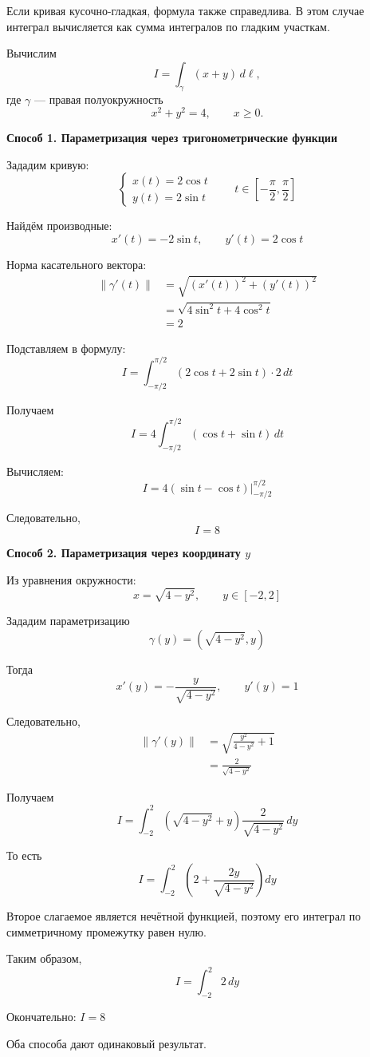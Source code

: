 \documentclass[12pt,a4paper]{article}
\begin{document}
\begin{note}
Если кривая кусочно-гладкая, формула также справедлива. В этом случае интеграл вычисляется как сумма интегралов по гладким участкам.
\end{note}

\begin{example}
Вычислим
\[
I=\int_\gamma(x+y)\,d\ell,
\]
где $\gamma$ — правая полуокружность
\[
x^2+y^2=4,\qquad x\geq0.
\]

\textbf{Способ 1. Параметризация через тригонометрические функции}

Зададим кривую:
\[
\begin{cases}
x(t)=2\cos t\\
y(t)=2\sin t
\end{cases}
\qquad
t\in\left[-\frac{\pi}{2},\frac{\pi}{2}\right]
\]

Найдём производные:
\[
x'(t)=-2\sin t,\qquad
y'(t)=2\cos t
\]

Норма касательного вектора:
\[
\begin{aligned}
\|\gamma'(t)\|
&=\sqrt{(x'(t))^2+(y'(t))^2}\\
&=\sqrt{4\sin^2t+4\cos^2t}\\
&=2
\end{aligned}
\]

Подставляем в формулу:
\[
I=
\int_{-\pi/2}^{\pi/2}
(2\cos t+2\sin t)\cdot2\,dt
\]

Получаем
\[
I=
4\int_{-\pi/2}^{\pi/2}
(\cos t+\sin t)\,dt
\]

Вычисляем:
\[
I=
4\left.
(\sin t-\cos t)
\right|_{-\pi/2}^{\pi/2}
\]

Следовательно,
\[
I=8
\]

\textbf{Способ 2. Параметризация через координату $y$}

Из уравнения окружности:
\[
x=\sqrt{4-y^2},
\qquad
y\in[-2,2]
\]

Зададим параметризацию
\[
\gamma(y)=
\left(\sqrt{4-y^2},y\right)
\]

Тогда
\[
x'(y)=-\frac{y}{\sqrt{4-y^2}},
\qquad
y'(y)=1
\]

Следовательно,
\[
\begin{aligned}
\|\gamma'(y)\|
&=
\sqrt{\frac{y^2}{4-y^2}+1}\\
&=
\frac{2}{\sqrt{4-y^2}}
\end{aligned}
\]

Получаем
\[
I=
\int_{-2}^{2}
\left(\sqrt{4-y^2}+y\right)
\frac{2}{\sqrt{4-y^2}}\,dy
\]

То есть
\[
I=
\int_{-2}^{2}
\left(
2+\frac{2y}{\sqrt{4-y^2}}
\right)dy
\]

Второе слагаемое является нечётной функцией, поэтому его интеграл по симметричному промежутку равен нулю.

Таким образом,
\[
I=\int_{-2}^{2}2\,dy
\]

Окончательно: $I = 8$

Оба способа дают одинаковый результат.
\end{example}
\end{document}
